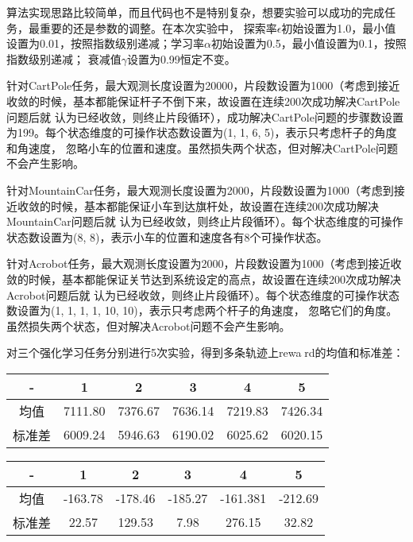 \documentclass[a4paper,UTF8]{article}
\theoremstyle{definition}
\begin{document}
算法实现思路比较简单，而且代码也不是特别复杂，想要实验可以成功的完成任务，最重要的还是参数的调整。在本次实验中，
探索率$\epsilon$初始设置为1.0，最小值设置为0.01，按照指数级别递减；学习率$\alpha$初始设置为0.5，最小值设置为0.1，按照指数级别递减；
衰减值$\gamma$设置为0.99恒定不变。

针对CartPole任务，最大观测长度设置为20000，片段数设置为1000（考虑到接近收敛的时候，基本都能保证杆子不倒下来，故设置在连续200次成功解决CartPole问题后就
认为已经收敛，则终止片段循环），成功解决CartPole问题的步骤数设置为199。每个状态维度的可操作状态数设置为(1, 1, 6, 5)，表示只考虑杆子的角度和角速度，
忽略小车的位置和速度。虽然损失两个状态，但对解决CartPole问题不会产生影响。

针对MountainCar任务，最大观测长度设置为2000，片段数设置为1000（考虑到接近收敛的时候，基本都能保证小车到达旗杆处，故设置在连续200次成功解决MountainCar问题后就
认为已经收敛，则终止片段循环）。每个状态维度的可操作状态数设置为(8, 8)，表示小车的位置和速度各有8个可操作状态。

针对Acrobot任务，最大观测长度设置为2000，片段数设置为1000（考虑到接近收敛的时候，基本都能保证关节达到系统设定的高点，故设置在连续200次成功解决Acrobot问题后就
认为已经收敛，则终止片段循环）。每个状态维度的可操作状态数设置为(1, 1, 1, 1, 10, 10)，表示只考虑两个杆子的角速度，
忽略它们的角度。虽然损失两个状态，但对解决Acrobot问题不会产生影响。

对三个强化学习任务分别进行5次实验，得到多条轨迹上reward的均值和标准差：

	\begin{tabular}{|c|c|c|c|c|c|}
	
		\hline
		
		\hline
		
		- & 1 & 2 & 3 & 4 & 5 \\
		
		\hline
		
		均值 & 7111.80 & 7376.67 & 7636.14 & 7219.83 & 7426.34\\

		\hline

		标准差 & 6009.24 & 5946.63 & 6190.02 & 6025.62 & 6020.15\\
		
		\hline
	
	\end{tabular}
	

	\begin{tabular}{|c|c|c|c|c|c|}
	
		\hline
		
		\hline
		
		- & 1 & 2 & 3 & 4 & 5 \\
		
		\hline
		
		均值 & -163.78 & -178.46 & -185.27 & -161.381 & -212.69\\

		\hline

		标准差 & 22.57 & 129.53 & 7.98 & 276.15 & 32.82\\
		
		\hline
	
	\end{tabular}
	
\end{document}
